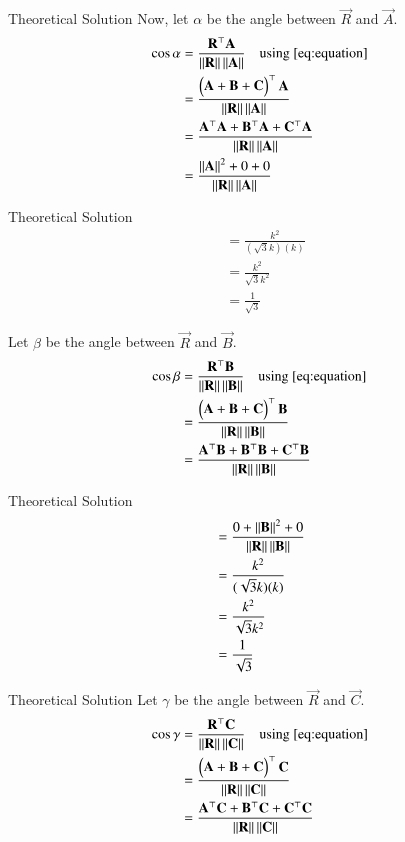 \documentclass{beamer}
\begin{document}
\begin{frame}{Theoretical Solution}
Now, let $\alpha$ be the angle between $\vec{R}$ and $\vec{A}$.
\begin{align}
\cos \alpha &= \frac{\mathbf{R}^\top \mathbf{A}}{\left\lVert\mathbf{R}\right\rVert \left\lVert\mathbf{A}\right\rVert} \quad \text{using } \eqref{eq:equation}   \\
&= \frac{\begin{pmatrix}\mathbf{A} + \mathbf{B} + \mathbf{C}\end{pmatrix}^\top \mathbf{A}}{\left\lVert\mathbf{R}\right\rVert \left\lVert\mathbf{A}\right\rVert}   \\
&= \frac{\mathbf{A}^\top \mathbf{A} + \mathbf{B}^\top \mathbf{A} + \mathbf{C}^\top \mathbf{A}}{\left\lVert\mathbf{R}\right\rVert \left\lVert\mathbf{A}\right\rVert}   \\
&= \frac{\left\lVert\mathbf{A}\right\rVert^2 + 0 + 0}{\left\lVert\mathbf{R}\right\rVert \left\lVert\mathbf{A}\right\rVert}  
\end{align}
\end{frame}

\begin{frame}{Theoretical Solution}
\begin{align}
&= \frac{k^2}{(\sqrt{3}k)(k)}  \\
&= \frac{k^2}{\sqrt{3}k^2}  \\
&= \frac{1}{\sqrt{3}}
\end{align}

Let $\beta$ be the angle between $\vec{R}$ and $\vec{B}$.
\begin{align}
\cos \beta &= \frac{\mathbf{R}^\top \mathbf{B}}{\left\lVert\mathbf{R}\right\rVert \left\lVert\mathbf{B}\right\rVert} \quad \text{using } \eqref{eq:equation}   \\
&= \frac{\begin{pmatrix}\mathbf{A} + \mathbf{B} + \mathbf{C}\end{pmatrix}^\top \mathbf{B}}{\left\lVert\mathbf{R}\right\rVert \left\lVert\mathbf{B}\right\rVert}   \\
&= \frac{\mathbf{A}^\top \mathbf{B} + \mathbf{B}^\top \mathbf{B} + \mathbf{C}^\top \mathbf{B}}{\left\lVert\mathbf{R}\right\rVert \left\lVert\mathbf{B}\right\rVert} 
\end{align}
\end{frame}

\begin{frame}{Theoretical Solution}
\begin{align}
&= \frac{0 + \left\lVert\mathbf{B}\right\rVert^2 + 0}{\left\lVert\mathbf{R}\right\rVert \left\lVert\mathbf{B}\right\rVert}   \\
&= \frac{k^2}{(\sqrt{3}k)(k)}   \\
&= \frac{k^2}{\sqrt{3}k^2}   \\
&= \frac{1}{\sqrt{3}}
\end{align}
\end{frame}

\begin{frame}{Theoretical Solution}
Let $\gamma$ be the angle between $\vec{R}$ and $\vec{C}$.
\begin{align}
\cos \gamma &= \frac{\mathbf{R}^\top \mathbf{C}}{\left\lVert\mathbf{R}\right\rVert \left\lVert\mathbf{C}\right\rVert} \quad \text{using } \eqref{eq:equation}   \\
&= \frac{\begin{pmatrix}\mathbf{A} + \mathbf{B} + \mathbf{C}\end{pmatrix}^\top \mathbf{C}}{\left\lVert\mathbf{R}\right\rVert \left\lVert\mathbf{C}\right\rVert}   \\
&= \frac{\mathbf{A}^\top \mathbf{C} + \mathbf{B}^\top \mathbf{C} + \mathbf{C}^\top \mathbf{C}}{\left\lVert\mathbf{R}\right\rVert \left\lVert\mathbf{C}\right\rVert}  
\end{align}
\end{frame}
\end{document}
